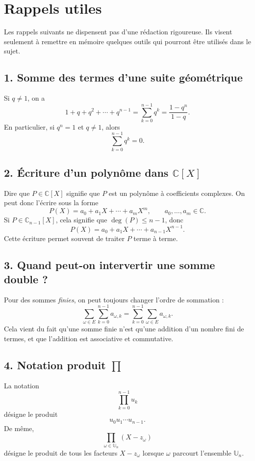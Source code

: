 \documentclass[11pt,a4paper]{article}
\newcommand{\C}{\mathbb{C}}
\newcommand{\U}{\mathbb{U}}
\begin{document}
\bigskip

\section*{Rappels utiles}

Les rappels suivants ne dispensent pas d'une rédaction rigoureuse. Ils visent seulement à remettre en mémoire
quelques outils qui pourront être utilisés dans le sujet.

\subsection*{1. Somme des termes d'une suite géométrique}

Si \(q\neq 1\), on a
\[
1+q+q^2+\cdots+q^{n-1}=\sum_{k=0}^{n-1}q^k=\frac{1-q^n}{1-q}.
\]
En particulier, si \(q^n=1\) et \(q\neq 1\), alors
\[
\sum_{k=0}^{n-1}q^k=0.
\]

\subsection*{2. Écriture d'un polynôme dans \(\C[X]\)}

Dire que \(P\in \C[X]\) signifie que \(P\) est un polynôme à coefficients complexes. On peut donc l'écrire sous la forme
\[
P(X)=a_0+a_1X+\cdots+a_mX^m,
\qquad a_0,\dots,a_m\in\C.
\]
Si \(P\in \C_{n-1}[X]\), cela signifie que \(\deg(P)\le n-1\), donc
\[
P(X)=a_0+a_1X+\cdots+a_{n-1}X^{n-1}.
\]
Cette écriture permet souvent de traiter \(P\) terme à terme.

\subsection*{3. Quand peut-on intervertir une somme double ?}

Pour des sommes \emph{finies}, on peut toujours changer l'ordre de sommation :
\[
\sum_{\omega\in E}\sum_{k=0}^{n-1} a_{\omega,k}
=
\sum_{k=0}^{n-1}\sum_{\omega\in E} a_{\omega,k}.
\]
Cela vient du fait qu'une somme finie n'est qu'une addition d'un nombre fini de termes, et que l'addition est associative et commutative.

\subsection*{4. Notation produit \(\prod\)}

La notation
\[
\prod_{k=0}^{n-1} u_k
\]
désigne le produit
\[
u_0u_1\cdots u_{n-1}.
\]
De même,
\[
\prod_{\omega\in \U_n}(X-z_\omega)
\]
désigne le produit de tous les facteurs \(X-z_\omega\) lorsque \(\omega\) parcourt l'ensemble \(\U_n\).
\end{document}
